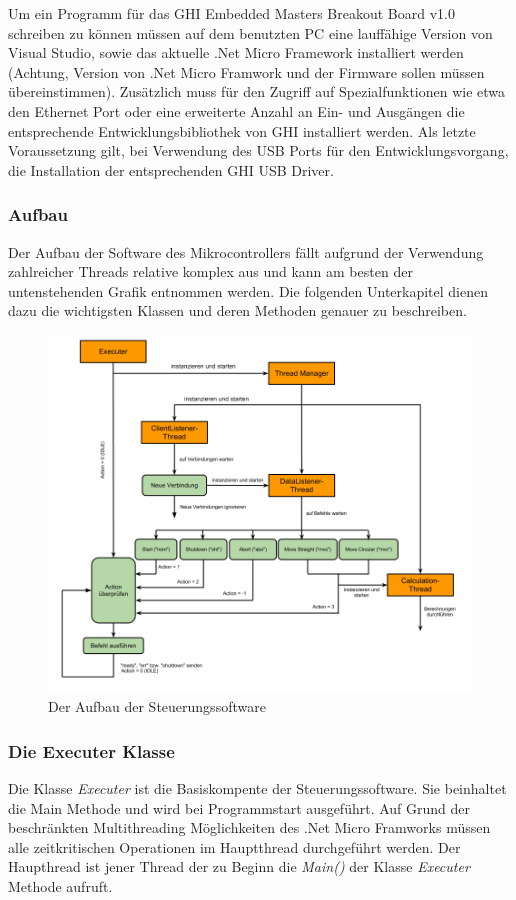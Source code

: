 Um ein Programm für das GHI Embedded Masters Breakout Board v1.0 schreiben zu können müssen auf dem benutzten PC eine lauffähige Version von Visual Studio, sowie das aktuelle .Net Micro Framework installiert werden (Achtung, Version von .Net Micro Framwork und der Firmware sollen müssen übereinstimmen). Zusätzlich muss für den Zugriff auf Spezialfunktionen wie etwa den Ethernet Port oder eine erweiterte Anzahl an Ein- und Ausgängen die entsprechende Entwicklungsbibliothek von GHI installiert werden. Als letzte Voraussetzung gilt, bei Verwendung des USB Ports für den Entwicklungsvorgang, die Installation der entsprechenden GHI USB Driver.  

\subsubsection{Aufbau}
Der Aufbau der Software des Mikrocontrollers fällt aufgrund der Verwendung zahlreicher Threads relative komplex aus und kann am besten der untenstehenden Grafik entnommen werden. Die folgenden Unterkapitel dienen dazu die wichtigsten Klassen und deren Methoden genauer zu beschreiben.

\begin{figure}[H]
\centering
\includegraphics[width=14cm]{images/GHISteuerungssoftware}
\caption{Der Aufbau der Steuerungssoftware}
\end{figure}

\subsubsection{Die Executer Klasse}
Die Klasse \textit{Executer} ist die Basiskompente der Steuerungssoftware. Sie beinhaltet die Main Methode und wird bei Programmstart ausgeführt.
Auf Grund der beschränkten Multithreading Möglichkeiten des .Net Micro Framworks müssen alle zeitkritischen Operationen im Hauptthread durchgeführt werden. Der Haupthread ist jener Thread der zu Beginn die \textit{Main()} der Klasse \textit{Executer} Methode aufruft.

